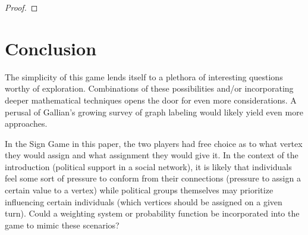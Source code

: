 \documentclass[amsart,11pt]{article}
\theoremstyle{dotless}
\theoremstyle{dotless}
\begin{document}
\begin{proof}



\end{proof}


\section{Conclusion}

The simplicity of this game lends itself to a plethora of interesting questions worthy of exploration. Combinations of these possibilities and/or incorporating deeper mathematical techniques opens the door for even more considerations. A perusal of Gallian's growing survey of graph labeling \cite{2} would likely yield even more approaches.

In the Sign Game in this paper, the two players had free choice as to what vertex they would assign and what assignment they would give it. In the context of the introduction (political support in a social network), it is likely that individuals feel some sort of pressure to conform from their connections (pressure to assign a certain value to a vertex) while political groups themselves may prioritize influencing certain individuals (which vertices should be assigned on a given turn). Could a weighting system or probability function be incorporated into the game to mimic these scenarios?
\end{document}
